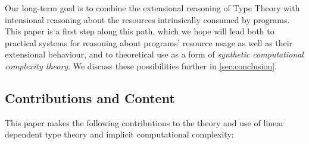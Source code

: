 \documentclass[acmsmall,screen]{acmart}
\begin{document}
Our long-term goal is to combine the extensional reasoning of Type
Theory with intensional reasoning about the resources intrinsically
consumed by programs. This paper is a first step along this path,
which we hope will lead both to practical systems for reasoning about
programs' resource usage as well as their extensional behaviour, and
to theoretical use as a form of \emph{synthetic computational
  complexity theory}. We discuss these possibilities further in
\autoref{sec:conclusion}.

\subsection{Contributions and Content}

This paper makes the following contributions to the theory and use of
linear dependent type theory and implicit computational complexity:
\end{document}
